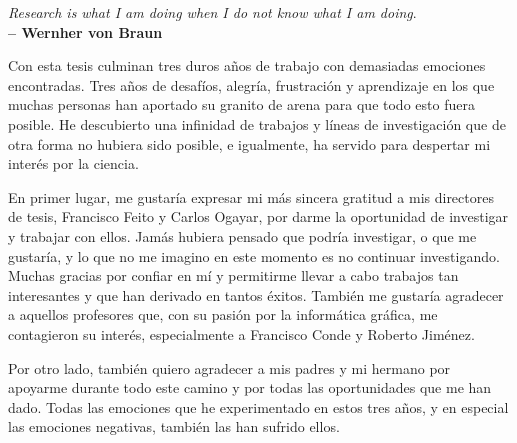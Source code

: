 \newpage
\begin{flushright}
	\textit{Research is what I am doing when I do not know what I am doing}.\\
    \textbf{-- Wernher von Braun}
\end{flushright}


\normalsize
\libertineNormal



\noindent Con esta tesis culminan tres duros años de trabajo con demasiadas emociones encontradas. Tres años de desafíos, alegría, frustración y aprendizaje en los que muchas personas han aportado su granito de arena para que todo esto fuera posible. He descubierto una infinidad de trabajos y líneas de investigación que de otra forma no hubiera sido posible, e igualmente, ha servido para despertar mi interés por la ciencia. 

\noindent En primer lugar, me gustaría expresar mi más sincera gratitud a mis directores de tesis, Francisco Feito y Carlos Ogayar, por darme la oportunidad de investigar y trabajar con ellos. Jamás hubiera pensado que podría investigar, o que me gustaría, y lo que no me imagino en este momento es no continuar investigando. Muchas gracias por confiar en mí y permitirme llevar a cabo trabajos tan interesantes y que han derivado en tantos éxitos. También me gustaría agradecer a aquellos profesores que, con su pasión por la informática gráfica, me contagieron su interés, especialmente a Francisco Conde y Roberto Jiménez. 

\noindent Por otro lado, también quiero agradecer a mis padres y mi hermano por apoyarme durante todo este camino y por todas las oportunidades que me han dado. Todas las emociones que he experimentado en estos tres años, y en especial las emociones negativas, también las han sufrido ellos.

